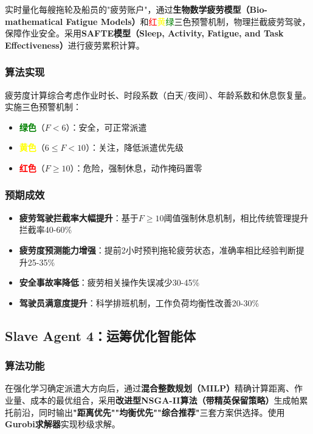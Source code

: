 \documentclass[12pt,a4paper]{article}
\begin{document}
实时量化每艘拖轮及船员的"疲劳账户"，通过\textbf{生物数学疲劳模型（Bio-mathematical Fatigue Models）}和\textcolor{red}{红}\textcolor{yellow}{黄}\textcolor{green}{绿}三色预警机制，物理拦截疲劳驾驶，保障作业安全。采用\textbf{SAFTE模型（Sleep, Activity, Fatigue, and Task Effectiveness）}进行疲劳累积计算。

\subsubsection{算法实现}

疲劳度计算综合考虑作业时长、时段系数（白天/夜间）、年龄系数和休息恢复量。实施三色预警机制：
\begin{itemize}[leftmargin=*]
    \item \textcolor{green}{\textbf{绿色}}（$F < 6$）：安全，可正常派遣
    \item \textcolor{yellow}{\textbf{黄色}}（$6 \leq F < 10$）：关注，降低派遣优先级
    \item \textcolor{red}{\textbf{红色}}（$F \geq 10$）：危险，强制休息，动作掩码置零
\end{itemize}

\subsubsection{预期成效}

\begin{itemize}[leftmargin=*]
    \item[\checkmark] \textbf{疲劳驾驶拦截率大幅提升}：基于$F\geq10$阈值强制休息机制，相比传统管理提升拦截率40-60\%
    \item[\checkmark] \textbf{疲劳度预测能力增强}：提前2小时预判拖轮疲劳状态，准确率相比经验判断提升25-35\%
    \item[\checkmark] \textbf{安全事故率降低}：疲劳相关操作失误减少30-45\%
    \item[\checkmark] \textbf{驾驶员满意度提升}：科学排班机制，工作负荷均衡性改善20-30\%
\end{itemize}

\subsection{Slave Agent 4：运筹优化智能体}

\subsubsection{算法功能}

在强化学习确定派遣大方向后，通过\textbf{混合整数规划（MILP）}精确计算距离、作业量、成本的最优组合，采用\textbf{改进型NSGA-II算法（带精英保留策略）}生成帕累托前沿，同时输出\textbf{"距离优先""均衡优先""综合推荐"}三套方案供选择。使用\textbf{Gurobi求解器}实现秒级求解。
\end{document}
